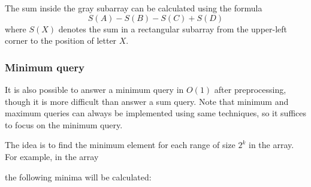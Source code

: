 The sum inside the gray subarray can be calculated
using the formula
\[S(A) - S(B) - S(C) + S(D)\]
where $S(X)$ denotes the sum in a rectangular
subarray from the upper-left corner
to the position of letter $X$.

\subsubsection{Minimum query}

It is also possible to answer a minimum query
in $O(1)$ after preprocessing, though it is
more difficult than answer a sum query.
Note that minimum and maximum queries can always
be implemented using same techniques,
so it suffices to focus on the minimum query.

The idea is to find the minimum element for each range
of size $2^k$ in the array.
For example, in the array

\begin{center}
\end{center}
the following minima will be calculated:

